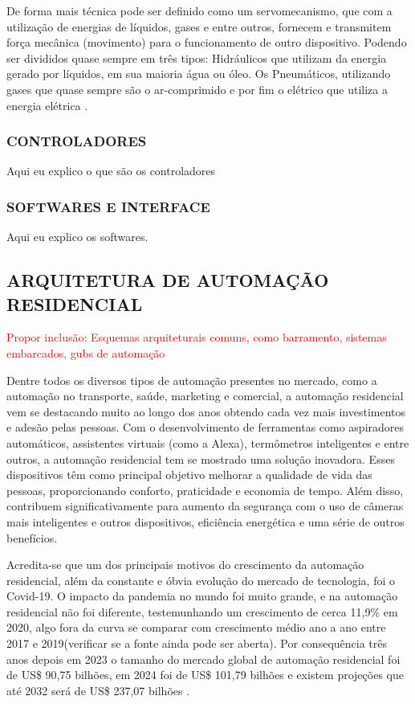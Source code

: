             De forma mais técnica pode ser definido como um servomecanismo, que com a utilização de energias de líquidos, gases e entre outros, fornecem e transmitem força mecânica (movimento) para o funcionamento de outro dispositivo. Podendo ser divididos quase sempre em três tipos: Hidráulicos que utilizam da energia gerado por líquidos, em sua maioria água ou óleo. Os Pneumáticos, utilizando gases que quase sempre são o ar-comprimido e por fim o elétrico que utiliza a energia elétrica \cite{atuadoresAutomacao}.

        \subsubsection{CONTROLADORES}
            Aqui eu explico o que são os controladores

        \subsubsection{SOFTWARES E INTERFACE}
            Aqui eu explico os softwares.

    \subsection{ARQUITETURA DE AUTOMAÇÃO RESIDENCIAL}

        \textcolor{red}{Propor inclusão: Esquemas arquiteturais comuns, como barramento, sistemas embarcados, gubs de automação}
    
        Dentre todos os diversos tipos de automação presentes no mercado, como a automação no transporte, saúde, marketing e comercial, a automação residencial vem se destacando muito ao longo dos anos obtendo cada vez mais investimentos e adesão pelas pessoas. Com o desenvolvimento de ferramentas como aspiradores automáticos, assistentes virtuais (como a Alexa), termômetros inteligentes e entre outros, a automação residencial tem se mostrado uma solução inovadora. Esses dispositivos têm como principal objetivo melhorar a qualidade de vida das pessoas, proporcionando conforto, praticidade e economia de tempo. Além disso, contribuem significativamente para aumento da segurança com o uso de câmeras mais inteligentes e outros dispositivos, eficiência energética e uma série de outros benefícios\cite{automacaoResidencial}.

        Acredita-se que um dos principais motivos do crescimento da automação residencial, além da constante e óbvia evolução do mercado de tecnologia, foi o Covid-19. O impacto da pandemia no mundo foi muito grande, e na automação residencial não foi diferente, testemunhando um crescimento de cerca 11,9\% em 2020, algo fora da curva se comparar com crescimento médio ano a ano entre 2017 e 2019\cite{automacaoCovid}(verificar se a fonte ainda pode ser aberta). Por consequência três anos depois em 2023 o tamanho do mercado global de automação residencial foi de US\$ 90,75 bilhões, em 2024 foi de US\$ 101,79 bilhões e existem projeções que até 2032 será de US\$ 237,07 bilhões \cite{automacaoDepoisCovid}.
        
